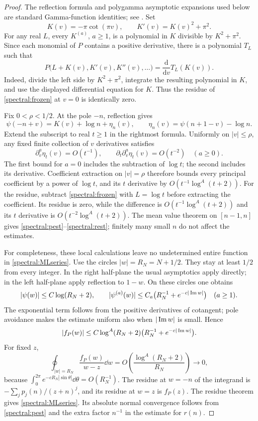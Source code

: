 \begin{proof}
The reflection formula and polygamma asymptotic expansions used below
are standard Gamma-function identities; see \cite[\S\S5.11,5.15]{DLMF}.
Set
\[
 K(v)=-\pi\cot(\pi v),\qquad K'(v)=K(v)^2+\pi^2.
\]
For any real $L$, every $K^{(a)}$, $a\geq1$, is a polynomial in $K$
divisible by $K^2+\pi^2$.  Since each monomial of $P$ contains a positive
derivative, there is a polynomial $T_L$ such that
\begin{equation}\label{spectral:frozen}
 P\bigl(L+K(v),K'(v),K''(v),\ldots\bigr)
       =\frac{\mathrm d}{\mathrm dv}T_L(K(v)).
\end{equation}
Indeed, divide the left side by $K^2+\pi^2$, integrate the resulting
polynomial in $K$, and use the displayed differential equation for $K$.
Thus the residue of \eqref{spectral:frozen} at $v=0$ is identically zero.

Fix $0<\rho<1/2$.  At the pole $-n$, reflection gives
\[
 \psi(-n+v)=K(v)+\log n+\eta_n(v),\qquad
 \eta_n(v)=\psi(n+1-v)-\log n.
\]
Extend the subscript to real $t\geq1$ in the rightmost formula.  Uniformly
on $|v|\leq\rho$, any fixed finite collection of $v$ derivatives satisfies
\[
 \partial_v^a\eta_t(v)=O(t^{-1}),\qquad
 \partial_t\partial_v^a\eta_t(v)=O(t^{-2})\quad(a\geq0).
\]
The first bound for $a=0$ includes the subtraction of $\log t$; the
second includes its derivative.  Coefficient extraction on $|v|=\rho$
therefore bounds every principal coefficient by a power of $\log t$,
and its $t$ derivative by $O(t^{-1}\log^A(t+2))$.  For the residue,
subtract \eqref{spectral:frozen} with $L=\log t$ before extracting the
coefficient.  Its residue is zero, while the difference is
$O(t^{-1}\log^A(t+2))$ and its $t$ derivative is
$O(t^{-2}\log^A(t+2))$.  The mean value theorem on $[n-1,n]$ gives
\eqref{spectral:pest}--\eqref{spectral:rest}; finitely many small $n$
do not affect the estimates.

For completeness, these local calculations leave no undetermined entire
function in \eqref{spectral:MLseries}.  Use the circles
$|w|=R_N=N+1/2$.  They stay at least $1/2$ from every integer.  In the
right half-plane the usual asymptotics apply directly; in the left
half-plane apply reflection to $1-w$.  On these circles one obtains
\[
 |\psi(w)|\leq C\log(R_N+2),\qquad
 |\psi^{(a)}(w)|\leq C_a
       \bigl(R_N^{-1}+e^{-c|\operatorname{Im} w|}\bigr)\quad(a\geq1).
\]
The exponential term follows from the positive derivatives of cotangent;
pole avoidance makes the estimate uniform also when $|\operatorname{Im} w|$ is small.
Hence
\[
 |f_P(w)|\leq C\log^A(R_N+2)
                  \bigl(R_N^{-1}+e^{-c|\operatorname{Im} w|}\bigr).
\]
For fixed $z$,
\[
 \oint_{|w|=R_N}\frac{f_P(w)}{w-z}\dd w
     =O\!\left(\frac{\log^A(R_N+2)}{R_N}\right)\longrightarrow0,
\]
because $\int_0^{2\pi}e^{-cR_N|\sin\theta|}\dd\theta=O(R_N^{-1})$.
The residue at $w=-n$ of the integrand is
$-\sum_jp_j(n)/(z+n)^j$, and its residue at $w=z$ is $f_P(z)$.
The residue theorem gives \eqref{spectral:MLseries}.  Its absolute normal
convergence follows from \eqref{spectral:pest} and the extra factor
$n^{-1}$ in the estimate for $r(n)$.


\end{proof}
